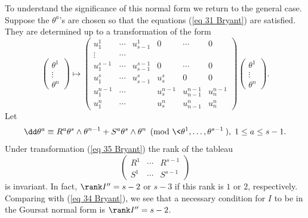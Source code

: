 To understand the significance of this normal form we return to the general case. Suppose the $\theta^a$'s are chosen so that the equations (\ref{eq 31 Bryant}) are satisfied. They are determined up to a transformation of the form
\[
\begin{pmatrix}
    \theta^1 \\
    \vdots \\
    \theta^n
\end{pmatrix}\mapsto 
\begin{pmatrix}
    u^1_1 & \cdots & u^1_{s-1} & 0 & \cdots & 0\\
    \vdots & \cdots & & &\\
    u^{s-1}_1 & \cdots & u^{s-1}_{s-1} & 0 & \cdots & 0\\
    u^s_1 & \cdots & u^s_{s-1} & u^s_s & 0 & 0\\
    u^{n-1}_1 & \cdots & & u^{n-1}_s & u^{n-1}_{n-1}& u^{n-1}_n\\
    u^n_1 & \cdots & & u^n_s & u^n_{n-1} & u^n_n
\end{pmatrix}
\begin{pmatrix}
    \theta^1 \\
    \vdots \\
    \theta^n
\end{pmatrix}.\label{eq 35 Bryant}
\]
Let 
\[\dd\theta^a\equiv R^a \theta^s\wedge\theta^{n-1}+S^a \theta^s\wedge\theta^n \pmod{\<\theta^1,\ldots,\theta^{s-1}\>},\;1\leq a\leq s-1.\]
Under transformation (\ref{eq 35 Bryant}) the rank of the tableau 
\[\begin{pmatrix}
    R^1 & \cdots & R^{s-1}\\
    S^1 & \cdots & S^{s-1}
\end{pmatrix}\label{eq 36 Bryant}
\]
is invariant. In fact, $\rank I''=s-2$ or $s-3$ if this rank is $1$ or $2$, respectively. Comparing with (\ref{eq 34 Bryant}), we see that a necessary condition for $I$ to be in the Goursat normal form is $\rank I''=s-2$.


